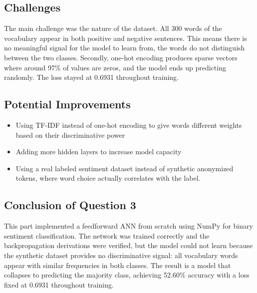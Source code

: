 \documentclass[sigconf]{acmart}
\begin{document}
\subsection{Challenges}
The main challenge was the nature of the dataset. All 300 words of the vocabulary appear in both positive and negative sentences. This means there is no meaningful signal for the model to learn from, the words do not distinguish between the two classes. Secondly, one-hot encoding produces sparse vectors where around 97\% of values are zeros, and the model ends up predicting randomly. The loss stayed at 0.6931 throughout training.

\subsection{Potential Improvements}
\begin{itemize}
    \item Using TF-IDF instead of one-hot encoding to give words different weights based on their discriminative power
    \item Adding more hidden layers to increase model capacity
    \item Using a real labeled sentiment dataset instead of synthetic anonymized tokens, where word choice actually correlates with the label.
\end{itemize}

\subsection{Conclusion of Question 3}
This part implemented a feedforward ANN from scratch using NumPy for binary sentiment classification. The network was trained correctly and the backpropagation derivations were verified, but the model could not learn because the synthetic dataset provides no discriminative signal: all vocabulary words appear with similar frequencies in both classes. The result is a model that collapses to predicting the majority class, achieving 52.60\% accuracy with a loss fixed at 0.6931 throughout training.

\end{document}
